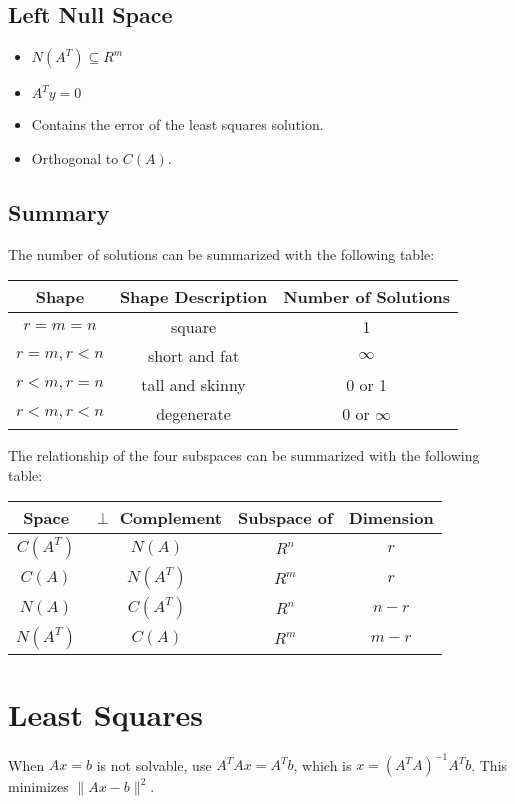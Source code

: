 \documentclass[12pt]{article}
\begin{document}
\begin{itemize}
\subsection{Left Null Space}
\begin{itemize}
\item $N(A^T) \subseteq R^m$

\item $A^T y = 0$

\item Contains the error of the least squares solution.

\item Orthogonal to $C(A)$.
\end{itemize}

\subsection{Summary}
The number of solutions can be summarized with the following table:
\begin{table}[H]
\centering
\begin{tabular}{c|c|c|}
Shape & Shape Description & Number of Solutions\\
\hline
$r=m=n$ & square & 1\\
$r=m, r<n$ & short and fat & $\infty$\\
$r<m, r=n$ & tall and skinny & 0 or 1\\
$r<m, r<n$ & degenerate & 0 or $\infty$
\end{tabular}
\end{table}

The relationship of the four subspaces can be summarized with the following table:
\begin{table}[H]
\centering
\begin{tabular}{c|c|c|c|}
Space & $\perp$ Complement & Subspace of & Dimension\\
\hline
$C(A^T)$ & $N(A)$ & $R^n$ & $r$\\
$C(A)$ & $N(A^T)$ & $R^m$ & $r$\\
$N(A)$ & $C(A^T)$ & $R^n$ & $n-r$\\
$N(A^T)$ & $C(A)$ & $R^m$ & $m-r$
\end{tabular}
\end{table}


\section{Least Squares}
When $Ax=b$ is not solvable, use $A^TAx=A^Tb$, which is $x = (A^T A)^{-1} A^T b$.  This minimizes $\|Ax - b\|^2$.


\end{itemize}
\end{document}
